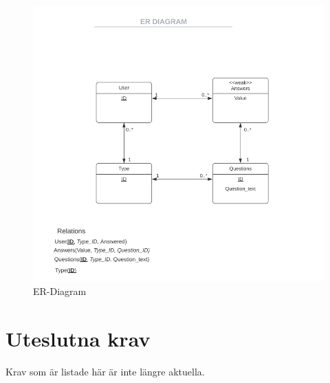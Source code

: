 \documentclass{article}
\begin{document}
    \begin{figure}[h!]
    
    \includegraphics[width=150mm]{ERDIAGRAM.png}
    \caption{ER-Diagram}
    \end{figure}
    
    \section{Uteslutna krav}
    Krav som är listade här är inte längre aktuella.
    
    

    
        





\end{document}
